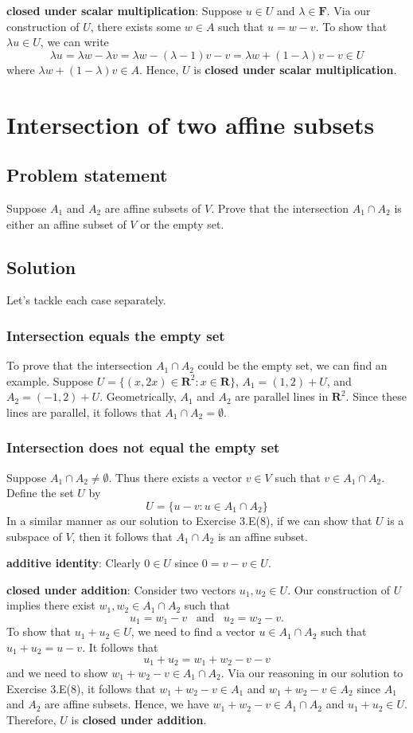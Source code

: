 \documentclass{article}
\begin{document}
\textbf{closed under scalar multiplication}: Suppose $u\in U$ and $\lambda\in\mathbf{F}$. 
Via our construction of $U$, there exists some $w\in A$ such that $u=w-v$. 
To show that $\lambda u\in U$, we can write
\[\lambda u=\lambda w - \lambda v=\lambda w - (\lambda -1)v-v=\lambda w+(1-\lambda)v-v\in U\]
where $\lambda w+(1-\lambda)v\in A$. Hence, $U$ is \textbf{closed under scalar multiplication}.

\clearpage

\section{Intersection of two affine subsets}
\subsection*{Problem statement}
Suppose $A_1$ and $A_2$ are affine subsets of $V$. 
Prove that the intersection $A_1\cap A_2$ is either an affine subset of $V$ or the empty set.

\subsection*{Solution}
Let's tackle each case separately.

\subsubsection*{Intersection equals the empty set}
To prove that the intersection $A_1\cap A_2$ could be the empty set, we can find an example. 
Suppose $U=\{(x,2x)\in\mathbf{R}^2:x\in\mathbf{R}\}$, $A_1=(1,2)+U$, and $A_2=(-1,2)+U$. 
Geometrically, $A_1$ and $A_2$ are parallel lines in $\mathbf{R}^2$. 
Since these lines are parallel, it follows that $A_1\cap A_2=\emptyset$.

\subsubsection*{Intersection does not equal the empty set}
Suppose $A_1\cap A_2\neq\emptyset$. 
Thus there exists a vector $v\in V$ such that $v\in A_1\cap A_2$. 
Define the set $U$ by 
\[U=\{u-v:u\in A_1\cap A_2\}\]
In a similar manner as our solution to Exercise 3.E(8), if we can show that $U$ is a subspace of $V$, then it follows that $A_1\cap A_2$ is an affine subset. 

\textbf{additive identity}: Clearly $0\in U$ since $0=v-v\in U$.

\textbf{closed under addition}: Consider two vectors $u_1,u_2\in U$. 
Our construction of $U$ implies there exist $w_1,w_2\in A_1\cap A_2$ such that
\[u_1=w_1-v\;\;\;\text{and}\;\;\;u_2=w_2-v.\]
To show that $u_1+u_2\in U$, we need to find a vector $u\in  A_1\cap A_2$ such \newline that $u_1+u_2=u-v$. 
It follows that
\[u_1+u_2=w_1+w_2-v-v\]
and we need to show $w_1+w_2-v\in  A_1\cap A_2$. 
Via our reasoning in our solution to Exercise 3.E(8), it follows that $w_1+w_2-v\in A_1$ and $w_1+w_2-v\in A_2$ since $A_1$ and $A_2$ are affine subsets. Hence, we have $w_1+w_2-v\in  A_1\cap A_2$ and $u_1+u_2\in U$. Therefore,  $U$ is \textbf{closed under addition}.
\end{document}
